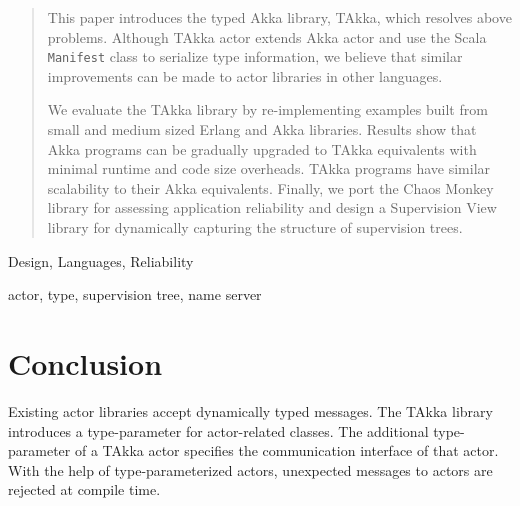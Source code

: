 \documentclass[preprint, authoryear, 10 pt]{sigplanconf}
\begin{document}
\begin{abstract}
This paper introduces the typed Akka library, TAkka, which resolves above
problems. Although TAkka actor extends Akka actor and use the Scala 
{\tt Manifest} class to serialize type information, we believe that similar 
improvements 
can be made to actor libraries in other languages.

We evaluate the TAkka library by re-implementing examples built from small and 
medium sized Erlang and Akka libraries.  Results show that Akka programs can be gradually upgraded 
to TAkka equivalents with minimal runtime and code size overheads.  
TAkka programs have similar scalability to their Akka equivalents. 
Finally, we port the Chaos Monkey library for assessing application reliability 
and design a Supervision View library for dynamically capturing the structure 
of supervision trees.

\begin{comment}
This paper presents the design, implementation and preliminary evaluation
results of the TAkka library, where types of actor related components are
statically typed and operations are type checked at the earliest possibility.
We introduce actors parameterized by the type of messages they expect to
receive. We show that it is straightforward to construct
supervision trees of type-parameterized actors. We minimize the number of system
messages that may be handled by general users by providing standard supervision
strategies.


\end{comment}


\end{abstract}


\terms
Design, Languages, Reliability

\keywords
actor, type, supervision tree, name server











\section{Conclusion}

Existing actor libraries accept dynamically typed messages.  The TAkka
library introduces a type-parameter for actor-related classes. The additional 
type-parameter of a TAkka actor specifies the communication interface of 
that actor.  With the help of type-parameterized actors, unexpected 
messages to actors are rejected at compile time.
\end{document}
